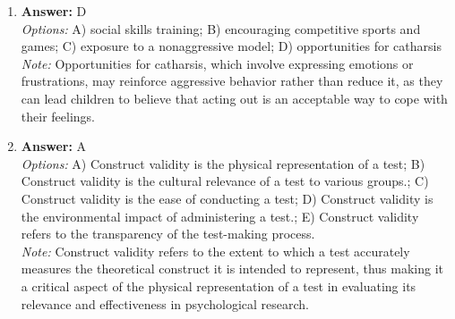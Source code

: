 \documentclass[12pt]{article}
\begin{document}
\begin{enumerate}[label=\arabic*.]
\item \textbf{Answer:} D
\\ \textit{Options:} A) social skills training; B) encouraging competitive sports and games; C) exposure to a nonaggressive model; D) opportunities for catharsis
\\ \textit{Note:} Opportunities for catharsis, which involve expressing emotions or frustrations, may reinforce aggressive behavior rather than reduce it, as they can lead children to believe that acting out is an acceptable way to cope with their feelings.
\item \textbf{Answer:} A
\\ \textit{Options:} A) Construct validity is the physical representation of a test; B) Construct validity is the cultural relevance of a test to various groups.; C) Construct validity is the ease of conducting a test; D) Construct validity is the environmental impact of administering a test.; E) Construct validity refers to the transparency of the test-making process.
\\ \textit{Note:} Construct validity refers to the extent to which a test accurately measures the theoretical construct it is intended to represent, thus making it a critical aspect of the physical representation of a test in evaluating its relevance and effectiveness in psychological research.
\end{enumerate}
\end{document}
